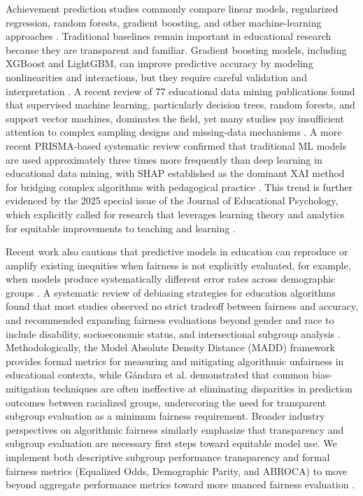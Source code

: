 \documentclass[pdflatex,sn-mathphys-ay]{sn-jnl}
\begin{document}
Achievement prediction studies commonly compare linear models, regularized regression, random forests, gradient boosting, and other machine-learning approaches \citep{Hastie_Tibshirani_Friedman_2009,James_Witten_Hastie_Tibshirani_2021}. Traditional baselines remain important in educational research because they are transparent and familiar. Gradient boosting models, including XGBoost and LightGBM, can improve predictive accuracy by modeling nonlinearities and interactions, but they require careful validation and interpretation \citep{Chen_Guestrin_2016,Ke_2017}. A recent review of 77 educational data mining publications found that supervised machine learning, particularly decision trees, random forests, and support vector machines, dominates the field, yet many studies pay insufficient attention to complex sampling designs and missing-data mechanisms \citep{Ersozlu_2024}. A more recent PRISMA-based systematic review confirmed that traditional ML models are used approximately three times more frequently than deep learning in educational data mining, with SHAP established as the dominant XAI method for bridging complex algorithms with pedagogical practice \citep{Gunasekara_Saarela_2024}. This trend is further evidenced by the 2025 special issue of the Journal of Educational Psychology, which explicitly called for research that leverages learning theory and analytics for equitable improvements to teaching and learning \citep{JEP_2025_special}.

Recent work also cautions that predictive models in education can reproduce or amplify existing inequities when fairness is not explicitly evaluated, for example, when models produce systematically different error rates across demographic groups \citep{Baker_Hawn_2021,Kizilcec_Lee_2022}. A systematic review of debiasing strategies for education algorithms found that most studies observed no strict tradeoff between fairness and accuracy, and recommended expanding fairness evaluations beyond gender and race to include disability, socioeconomic status, and intersectional subgroup analysis \citep{Idowu_2024_debiasing}. Methodologically, the Model Absolute Density Distance (MADD) framework \citep{Verger_2024_MADD} provides formal metrics for measuring and mitigating algorithmic unfairness in educational contexts, while Gándara et al. \citep{Gandara_2024_blackbox} demonstrated that common bias-mitigation techniques are often ineffective at eliminating disparities in prediction outcomes between racialized groups, underscoring the need for transparent subgroup evaluation as a minimum fairness requirement. Broader industry perspectives on algorithmic fairness \citep{Holstein_2019} similarly emphasize that transparency and subgroup evaluation are necessary first steps toward equitable model use. We implement both descriptive subgroup performance transparency and formal fairness metrics (Equalized Odds, Demographic Parity, and ABROCA) to move beyond aggregate performance metrics toward more nuanced fairness evaluation \citep{Li_2025}.
\end{document}
